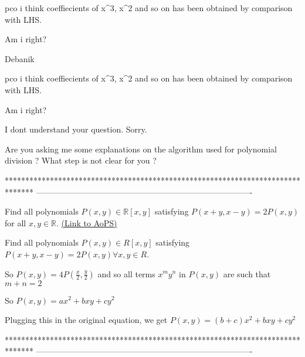 \begin{solution}
	pco i think coeffiecients of x^3, x^2 and so on has been obtained by comparison with LHS.

Am i right?




\begin{bolded}Debanik\end{bolded}
\end{solution}



\begin{solution}
	\begin{tcolorbox}pco i think coeffiecients of x^3, x^2 and so on has been obtained by comparison with LHS.

Am i right?\end{tcolorbox}

I dont understand your question. Sorry.

Are you asking me some explanations on the algorithm used for polynomial division ?
What step is not clear for you ?
\end{solution}
*******************************************************************************
-------------------------------------------------------------------------------

\begin{problem}
	Find all polynomials $ P(x,y) \in \mathbb R[x,y]$ satisfying $ P(x+y,x-y)=2P(x,y)$ for all $ x,y \in \mathbb R$.
	\flushright \href{https://artofproblemsolving.com/community/c6h332771}{(Link to AoPS)}
\end{problem}



\begin{solution}
	\begin{tcolorbox}Find all polynomials $ P(x,y) \in R[x,y]$ satisfying $ P(x + y,x - y) = 2P(x,y) \forall x,y \in R$.\end{tcolorbox}

So $ P(x,y)=4P(\frac x2,\frac y2)$ and so all terms $ x^my^n$ in $ P(x,y)$ are such that $ m+n=2$

So $ P(x,y)=ax^2+bxy+cy^2$

Plugging this in the original equation, we get $ \boxed{P(x,y)=(b+c)x^2+bxy+cy^2}$
\end{solution}
*******************************************************************************
-------------------------------------------------------------------------------

